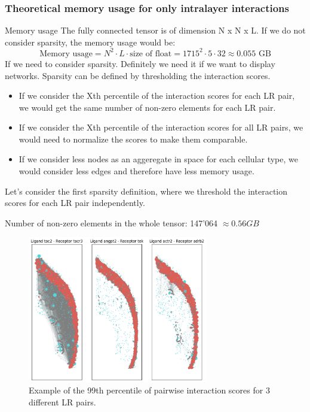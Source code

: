 \begin{frame}
    \frametitle{Theoretical memory usage for only intralayer interactions}
    \begin{block}{Memory usage}
        The fully connected tensor is of dimension N x N x L. If we do not consider sparsity, the memory usage would be:
        \begin{equation*}
            \text{Memory usage} = N^2 \cdot L \cdot \text{size of float} = 1715^2 \cdot 5 \cdot 32 \approx 0.055 \text{ GB}
        \end{equation*}
        If we need to consider sparsity. Definitely we need it if we want to display networks.
        Sparsity can be defined by thresholding the interaction scores.
        \begin{itemize}
            \item If we consider the Xth percentile of the interaction scores for each LR pair, we
                would get the same number of non-zero elements for each LR pair.
            \item If we consider the Xth percentile of the interaction scores for all LR pairs,
                we would need to normalize the scores to make them comparable.
            \item If we consider less nodes as an aggeregate in space for each cellular type, we would consider less edges
                and therefore have less memory usage.
        \end{itemize}

    \end{block}
    Let's consider the first sparsity definition, where we threshold the interaction scores for
    each LR pair independently.

\end{frame}

\begin{frame}
    Number of non-zero elements in the whole tensor: 147'064 $\approx 0.56 \textit{GB}$
    \begin{figure}
        \centering
        \includegraphics[width=0.7\textwidth]{media/poc_slice153_astro_l23it.png}
        \caption{Example of the 99th percentile of pairwise interaction scores for 3 different LR pairs.}
    \end{figure}

\end{frame}

